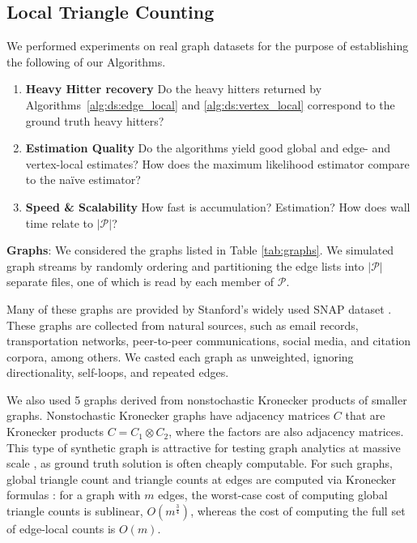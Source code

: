 \documentclass[10]{article}
\begin{document}
\subsection{Local Triangle Counting}
 \label{DS:sec:experiments:triangles}

We performed experiments on real graph datasets for the purpose of establishing the following of our Algorithms.
\begin{enumerate}
	\item \textbf{Heavy Hitter recovery	} Do the heavy hitters returned by Algorithms~\ref{alg:ds:edge_local} and \ref{alg:ds:vertex_local} correspond to the ground truth heavy hitters?
	\item \textbf{Estimation Quality} Do the algorithms yield good global and edge- and vertex-local estimates? How does the maximum likelihood estimator compare to the na\"ive estimator?
	\item \textbf{Speed \& Scalability} How fast is accumulation? Estimation? How does wall time relate to $|\mathcal{P}|$?
\end{enumerate}



\noindent
\textbf{Graphs}: 
We considered the graphs listed in Table \ref{tab:graphs}.
We simulated graph streams by randomly ordering and partitioning the edge lists into $|\mathcal{P}|$ separate files, one of which is read by each member of $\mathcal{P}$.

Many of these graphs are provided by Stanford's widely used SNAP dataset \cite{snapnets}.
These graphs are collected from natural sources, such as email records, transportation networks, peer-to-peer communications, social media, and citation corpora, among others.
We casted each graph as unweighted, ignoring directionality, self-loops, and repeated edges. 

We also used 5 graphs derived from nonstochastic Kronecker products of smaller graphs.
Nonstochastic Kronecker graphs \cite{weichsel1962kronecker} have adjacency matrices $C$ that are Kronecker products $C = C_1 \otimes C_2$, where the factors are also adjacency matrices.
This type of synthetic graph is attractive for testing graph analytics at massive scale \cite{leskovec2010kronecker, kepner2018design}, as ground truth solution is often cheaply computable.
For such graphs, global triangle count and triangle counts at edges are computed via Kronecker formulas \cite{sanders2018large}: for a graph with $m$ edges, the worst-case cost of computing global triangle counts is sublinear, $O \left ( m^{\frac{3}{4}} \right )$, whereas the cost of computing the full set of edge-local counts is $O \left ( m \right )$.
\end{document}
